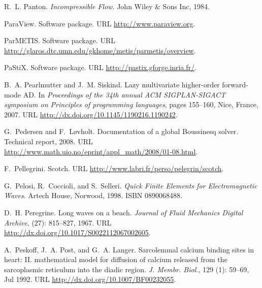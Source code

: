 \begin{thebibliography}{467}
R.~L. Panton.
\newblock \emph{Incompressible Flow}.
\newblock John Wiley \& Sons Inc, 1984.

{ParaView}.
\newblock Software package.
\newblock URL \url{http://www.paraview.org}.

ParMETIS.
\newblock Software package.
\newblock URL \url{http://glaros.dtc.umn.edu/gkhome/metis/parmetis/overview}.

PaStiX.
\newblock Software package.
\newblock URL \url{http://pastix.gforge.inria.fr/}.

B.~A. Pearlmutter and J.~M. Siskind.
\newblock Lazy multivariate higher-order forward-mode {AD}.
\newblock In \emph{Proceedings of the 34th annual ACM SIGPLAN-SIGACT symposium
  on Principles of programming languages}, pages 155--160, Nice, France, 2007.
\newblock URL \url{http://dx.doi.org/10.1145/1190216.1190242}.

G.~Pedersen and F.~L{\o}vholt.
\newblock Documentation of a global {B}oussinesq solver.
\newblock Technical report, 2008.
\newblock URL \url{http://www.math.uio.no/eprint/appl_math/2008/01-08.html}.

F.~Pellegrini.
\newblock Scotch.
\newblock URL \url{http://www.labri.fr/perso/pelegrin/scotch}.

G.~Pelosi, R.~Coccioli, and S.~Selleri.
\newblock \emph{Quick Finite Elements for Electromagnetic Waves}.
\newblock Artech House, Norwood, 1998.
\newblock ISBN 0890068488.

D.~H. Peregrine.
\newblock Long waves on a beach.
\newblock \emph{Journal of Fluid Mechanics Digital Archive}, 
  (27): 815--827, 1967.
\newblock URL \url{http://dx.doi.org/10.1017/S0022112067002605}.

A.~Peskoff, J.~A. Post, and G.~A. Langer.
\newblock Sarcolemmal calcium binding sites in heart: {II}. mathematical model
  for diffusion of calcium released from the sarcoplasmic reticulum into the
  diadic region.
\newblock \emph{J. Membr. Biol.}, 129 (1): 59--69, Jul 1992.
\newblock URL \url{http://dx.doi.org/10.1007/BF00232055}.


\end{thebibliography}
